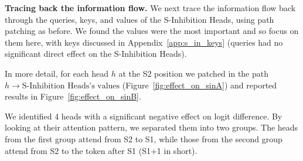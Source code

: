 \textbf{Tracing back the information flow.} We next trace the information flow back through the queries, keys, and values of the S-Inhibition Heads, using path patching as before. We found the values were the most important and so focus on them here, with keys discussed in Appendix~\ref{app:s_in_keys} (queries had no significant direct effect on the S-Inhibition Heads).

In more detail, for each head $h$ at the S2 position we patched in the path $h \to \text{S-Inhibition Heads's values}$ (Figure~\ref{fig:effect_on_sinA}) and reported results in Figure~\ref{fig:effect_on_sinB}. 

We identified 4 heads with a significant negative effect on logit difference.
By looking at their attention pattern, we separated them into two groups. The heads from the first group attend from S2 to S1, while those from the second group attend from S2 to the token after S1 (S1+1 in short). %






